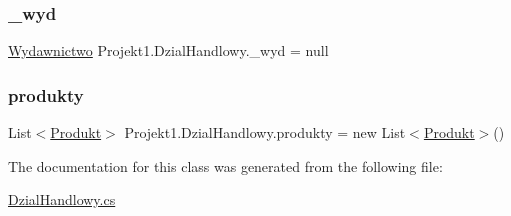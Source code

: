 \subsubsection{\texorpdfstring{\_wyd}{\_wyd}}
{\footnotesize\ttfamily \mbox{\hyperlink{class_projekt1_1_1_wydawnictwo}{Wydawnictwo}} Projekt1.\+Dzial\+Handlowy.\+\_\+wyd = null}

\mbox{\label{class_projekt1_1_1_dzial_handlowy_a72a83f1d777ad8acafc3e071d1fc64d7}} 
\subsubsection{\texorpdfstring{produkty}{produkty}}
{\footnotesize\ttfamily List$<$\mbox{\hyperlink{class_projekt1_1_1_produkt}{Produkt}}$>$ Projekt1.\+Dzial\+Handlowy.\+produkty = new List$<$\mbox{\hyperlink{class_projekt1_1_1_produkt}{Produkt}}$>$()}



The documentation for this class was generated from the following file\+:\begin{DoxyCompactItemize}
\item 
\mbox{\hyperlink{_dzial_handlowy_8cs}{Dzial\+Handlowy.\+cs}}\end{DoxyCompactItemize}
